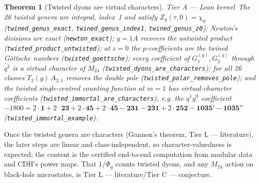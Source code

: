 \documentclass[11pt,a4paper]{article}
\newtheorem{theorem}{Theorem}[section]
\theoremstyle{remark}
\newcommand{\tierA}{\colorbox{green!15}{\textsf{\scriptsize Tier A --- Lean kernel}}}
\newcommand{\tierL}{\colorbox{blue!10}{\textsf{\scriptsize Tier L --- literature}}}
\newcommand{\tierC}{\colorbox{orange!15}{\textsf{\scriptsize Tier C --- conjecture}}}
\newcommand{\lean}[1]{\texttt{#1}}
\newcommand{\Mtf}{M_{24}}
\begin{document}
\begin{theorem}[Twisted dyons are virtual characters] \tierA\
The 26 twisted genera are integral, index~1 and satisfy $Z_g(\tau,0)=\chi_g$ (\lean{twined\_genus\_exact},
\lean{twined\_genus\_index1}, \lean{twined\_genus\_z0}); Newton's divisions are exact
(\lean{newton\_exact}); $g=1A$ recovers the untwisted product (\lean{twisted\_product\_untwisted}); at $z=0$
the $p$-coefficients are the twined Göttsche numbers (\lean{twisted\_goettsche}); every coefficient of
$G_1^{(g)},G_2^{(g)}$ through $q^2$ is a virtual character of $\Mtf$ (\lean{twisted\_dyons\_are\_characters});
for all 26 classes $T_2(g)\,A_{2,1}$ removes the double pole (\lean{twisted\_polar\_removes\_pole}); and the
twisted single-centred counting function at $m=1$ has virtual-character coefficients
(\lean{twisted\_immortal\_are\_characters}), e.g. the $q^1y^0$ coefficient
$-1800=2\cdot\mathbf1+2\cdot\mathbf{23}+2\cdot\mathbf{45}+2\cdot\overline{\mathbf{45}}-\mathbf{231}
-\overline{\mathbf{231}}+2\cdot\mathbf{252}-\mathbf{1035}'-\mathbf{1035}''$ (\lean{twisted\_immortal\_example}).
\end{theorem}
Once the twisted genera are characters (Gannon's theorem, \tierL), the later steps are linear and
class-independent, so character-valuedness is expected; the content is the certified end-to-end
computation from modular data and CDH's power maps. That $1/\Phi_g$ counts twisted dyons, and any
$\Mtf$ action on black-hole microstates, is \tierL/\tierC.

\end{document}
